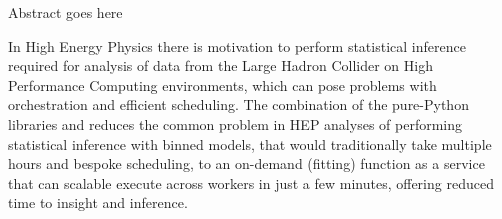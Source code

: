 Abstract goes here

In High Energy Physics there is motivation to perform statistical inference required for analysis of data from the Large Hadron Collider on High Performance Computing environments, which can pose problems with orchestration and efficient scheduling.
The combination of the pure-Python libraries \pyhf{} and \funcX{} reduces the common problem in HEP analyses of performing statistical inference with binned models, that would traditionally take multiple hours and bespoke scheduling, to an on-demand (fitting) function as a service that can scalable execute across workers in just a few minutes, offering reduced time to insight and inference.
